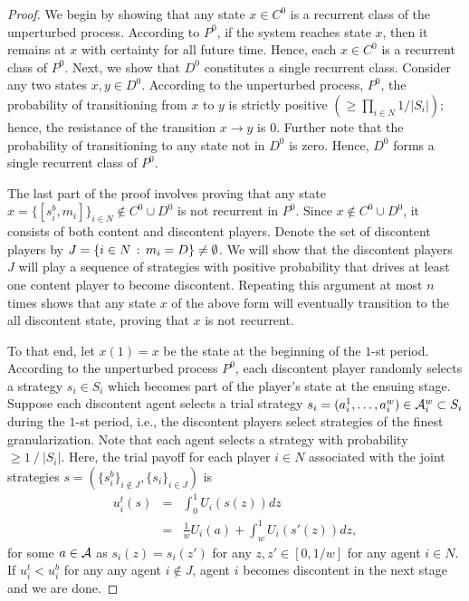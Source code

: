 \begin{proof}
%
We begin by showing that any state $x \in C^0$ is a recurrent class of the unperturbed process.  According to $P^0$, if the system reaches state $x$, then it remains at $x$ with certainty for all future time. Hence, each $x\in C^0$ is a recurrent class of $P^0.$  Next, we show that $D^0$ constitutes a single recurrent class.  Consider any two states $x,y\in D^0$.  According to the unperturbed process, $P^0$, the probability of transitioning from $x$ to $y$ is strictly positive $\left(\geq \prod_{i\in N}1/|S_i|\right)$; hence, the resistance of the transition $x \rightarrow y$ is $0$.  Further note that the probability of transitioning to any state not in $D^0$ is zero. Hence, $D^0$ forms a single recurrent class of $P^0$. 
%


The last part of the proof involves proving that any state $ x = \{[s_i^b, m_i]\}_{i \in N} \notin C^0 \cup D^0$ is not recurrent in $P^0$.  Since $x\notin {C^0\cup D^0}$, it consists of both content and discontent players.  Denote the set of discontent players by $J= \{i\in N\,:\, m_i = D\} \neq \emptyset$.  We will show that the discontent players $J$ will play a sequence of strategies with positive probability that drives at least one content player to become discontent.  Repeating this argument at most $n$ times shows that any state $x$ of the above form will eventually transition to the all discontent state, proving that $x$ is not recurrent.  

To that end, let $x(1) = x$ be the state at the beginning of the $1$-st period.  According to the unperturbed process $P^0$, each discontent player randomly selects a strategy $s_i \in S_i$ which becomes part of the player's state at the ensuing stage.  Suppose each discontent agent selects a trial strategy $s_i = (a_i^1, \dots, a_i^w) \in {\cal A}_i^w \subset S_i$ during the $1$-st period, i.e., the discontent players select strategies of the finest granularization. Note that each agent selects a strategy with probability $\geq {1\mathop{/}|S_i|}.$  Here, the trial payoff for each player $i \in N$ associated with the joint strategies $s = (\{s_i^b\}_{i \notin J}, \{s_i\}_{i \in J})$ is 
\begin{eqnarray}
u_i^t(s) &=&  \int_{0}^{1} U_i(s(z)) dz \\
&=&  \frac{1}{w} U_i({a}) + \int_{w}^{1} U_i(s'(z)) dz, 
\end{eqnarray}
%
for some ${a} \in {\cal A}$ as $s_i(z) = s_i(z')$ for any $z,z' \in [0,1/w]$ for any agent $i \in N$.  If  $u_i^t < u_i^b$ for any any agent $i \notin J$, agent $i$ becomes discontent in the next stage and we are done.  


\end{proof}
